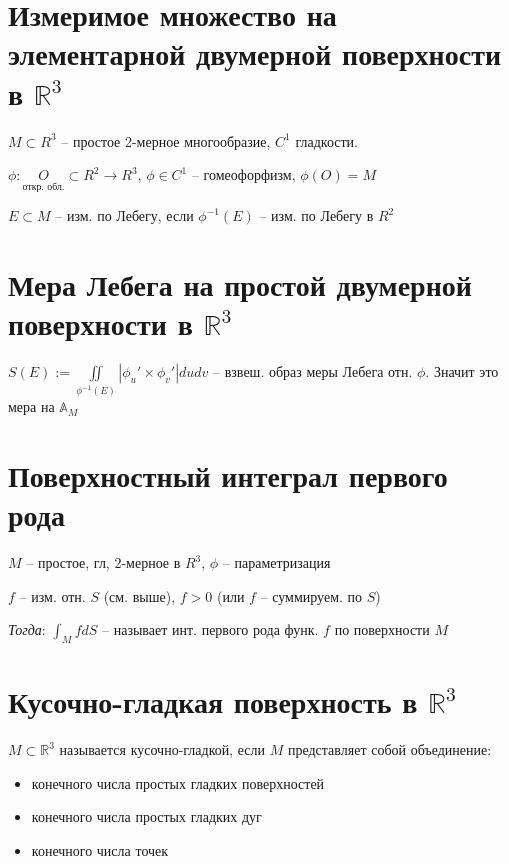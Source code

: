 \documentclass[paper=a4, fontsize=14pt]{report}
\begin{document}
	\section{Измеримое множество на элементарной двумерной поверхности в $\mathds{R}^3$}
	
	$ M \subset R^3 $ -- простое 2-мерное многообразие, $ C^1 $ гладкости.

	$ \phi : \underset{\text{откр. обл.}}{O} \subset R^2 \rightarrow R^3$, $ \phi \in C^1 $ -- гомеофорфизм, $ \phi(O) = M $

	$ E \subset M $ -- изм. по Лебегу, если $ \phi^{-1}(E) $ -- изм. по Лебегу в $ R^2 $
	
	\section{Мера Лебега на простой двумерной поверхности в $\mathds{R}^3$}

	$ S(E) := \iint\limits_{\phi^{-1}(E)} | \phi_u' \times \phi_v'| dudv $ -- взвеш. образ меры Лебега отн. $ \phi $. Значит это мера на $ \mathbb{A}_{M} $

	\section{Поверхностный интеграл первого рода}
        
        $ M $ -- простое, гл, 2-мерное в $ R^3 $, $ \phi $ -- параметризация

	$ f $ -- изм. отн. $S$ (см. выше), $ f > 0 $ (или $ f $ -- суммируем. по $ S $)

        \emph{Тогда}: $ \int_M f dS$ -- называет инт. первого рода функ. $ f $ по поверхности $M$

	\section{Кусочно-гладкая поверхность в $\mathds{R}^3$}
	
        $M \subset \mathbb R^3$ называется кусочно-гладкой, если $M$ представляет собой объединение:

    \begin{itemize}
	    \item конечного числа простых гладких поверхностей
	    \item конечного числа простых гладких дуг
	    \item конечного числа точек
    \end{itemize}
\end{document}
